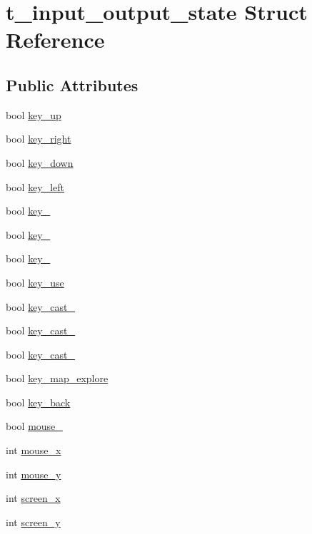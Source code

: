 \hypertarget{structt__input__output__state}{\section{t\-\_\-input\-\_\-output\-\_\-state Struct Reference}
\label{structt__input__output__state}
}
\subsection*{Public Attributes}
\begin{DoxyCompactItemize}
\item 
bool \hyperlink{structt__input__output__state_a3a7919d7cac4a16be272b9180e958c54}{key\-\_\-up}
\item 
bool \hyperlink{structt__input__output__state_af987d3e450c10a4e46b551f7aa1727d0}{key\-\_\-right}
\item 
bool \hyperlink{structt__input__output__state_aff3f4f05784c0a89291a2ac094f0a460}{key\-\_\-down}
\item 
bool \hyperlink{structt__input__output__state_a172f53bf31467a7570dee3edc04923ca}{key\-\_\-left}
\item 
bool \hyperlink{structt__input__output__state_a050ec7d2c78152a00db4e9ad1f3329ed}{key\-\_}
\item 
bool \hyperlink{structt__input__output__state_a919f0b46728019de55dd02716f529364}{key\-\_}
\item 
bool \hyperlink{structt__input__output__state_a24ef3f98deef214934007a0d88aeea82}{key\-\_}
\item 
bool \hyperlink{structt__input__output__state_a30f2ccfec5fdb7c45df57d02a9967845}{key\-\_\-use}
\item 
bool \hyperlink{structt__input__output__state_a58c75f9aee14025fc22d16100a7b638b}{key\-\_\-cast\-\_}
\item 
bool \hyperlink{structt__input__output__state_a84a4ec4b57148499b1ab2f25842fdac5}{key\-\_\-cast\-\_}
\item 
bool \hyperlink{structt__input__output__state_a82487c01eb24e2339682b0b0c7f0edab}{key\-\_\-cast\-\_}
\item 
bool \hyperlink{structt__input__output__state_a05ce15a5c21b6d6381220699a897ff0d}{key\-\_\-map\-\_\-explore}
\item 
bool \hyperlink{structt__input__output__state_a12366e6b5751103da0959aee7b55122b}{key\-\_\-back}
\item 
bool \hyperlink{structt__input__output__state_a5d93aef9032f6da00cc274bf4062f302}{mouse\-\_}
\item 
int \hyperlink{structt__input__output__state_ade192d11582991da2533029506ad959e}{mouse\-\_\-x}
\item 
int \hyperlink{structt__input__output__state_aa9680f3841a1f09512cbfbfd961b8886}{mouse\-\_\-y}
\item 
int \hyperlink{structt__input__output__state_af03e61a9a04ba5fe1a572ec3ce654e47}{screen\-\_\-x}
\item 
int \hyperlink{structt__input__output__state_ab04e56c5d58491073a68614686e2fc53}{screen\-\_\-y}
\end{DoxyCompactItemize}


